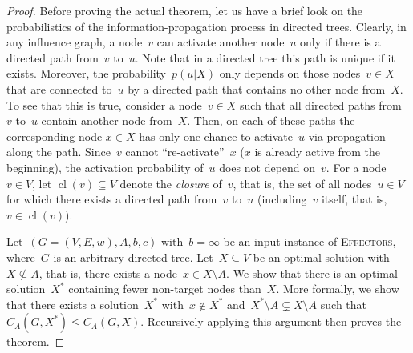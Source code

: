 \documentclass{article}
\DeclareMathOperator{\cl}{cl}
\newcommand{\probEffectors}{\textsc{Effectors}\xspace}
\begin{document}
\begin{proof}
  Before proving the actual theorem, let us have a brief look on the
  probabilistics of the information-propagation process in directed
  trees.
  Clearly, in any influence graph, a node~$v$ can activate another
  node~$u$ only if there is a directed path from~$v$ to~$u$.
  Note that in a directed tree this path is unique if it exists.
  Moreover, the probability~$p(u|X)$ only depends on
  those nodes~$v\in X$ that are connected to~$u$ by a directed path that
  contains no other node from~$X$.
  To see that this is true, consider a node~$v\in X$ such that all directed paths from~$v$ to~$u$ contain another node from~$X$. Then, on each of these paths the corresponding node $x\in X$ has only one chance to activate~$u$ via propagation along the path. Since~$v$ cannot ``re-activate''~$x$ ($x$ is already active from the beginning), the activation probability of~$u$ does not depend on~$v$. 
  For a node~$v\in V$, let $\cl(v)\subseteq V$ denote the \emph{closure} of~$v$,
  that is, the set of all nodes~$u\in V$ for which there exists a directed
  path from~$v$ to~$u$ (including~$v$ itself, that is, $v\in\cl(v)$).

  Let~$(G=(V,E,w),A,b,c)$ with~$b=\infty$ be an input instance of
  \probEffectors, where~$G$ is an arbitrary directed tree.
  Let~$X\subseteq V$ be an optimal solution with~$X \not\subseteq A$,
  that is, there exists a node~$x\in X\setminus A$.
  We show that there is an optimal solution~$X^*$ containing
  fewer non-target nodes than~$X$.
  More formally, we show that there exists a solution~$X^*$
  with~$x\not\in X^*$ and~$X^*\setminus A\subsetneq X\setminus A$ such that
  $C_A(G,X^*) \leq C_A(G,X)$. Recursively applying this argument
  then proves the theorem.


\end{proof}
\end{document}
